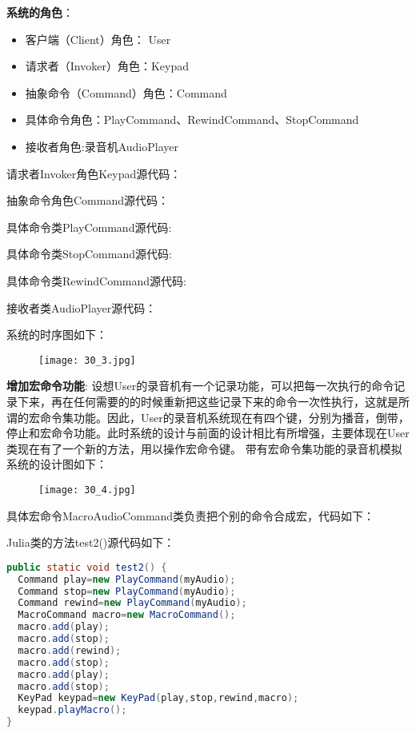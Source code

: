 \documentclass[../main.tex]{subfiles}
\begin{document}
\textbf{系统的角色}：
\begin{itemize}
  \item 客户端（Client）角色： User
  \item 请求者（Invoker）角色：Keypad
  \item 抽象命令（Command）角色：Command
  \item 具体命令角色：PlayCommand、RewindCommand、StopCommand
  \item 接收者角色:录音机AudioPlayer
\end{itemize}
%
请求者Invoker角色Keypad源代码：
%

%
抽象命令角色Command源代码：
%

%
具体命令类PlayCommand源代码:
%

%
具体命令类StopCommand源代码:
%

%
具体命令类RewindCommand源代码:
%

%
接收者类AudioPlayer源代码：
%


%
系统的时序图如下：
%
\begin{figure}[H]
  \texttt{[image: 30\_3.jpg]}
\end{figure}
%
\textbf{增加宏命令功能}:
设想User的录音机有一个记录功能，可以把每一次执行的命令记录下来，再在任何需要的的时候重新把这些记录下来的命令一次性执行，这就是所谓的宏命令集功能。因此，User的录音机系统现在有四个键，分别为播音，倒带，停止和宏命令功能。此时系统的设计与前面的设计相比有所增强，主要体现在User类现在有了一个新的方法，用以操作宏命令键。
带有宏命令集功能的录音机模拟系统的设计图如下：
%
\begin{figure}[H]
  \texttt{[image: 30\_4.jpg]}
\end{figure}
%

%
具体宏命令MacroAudioCommand类负责把个别的命令合成宏，代码如下：
%

%
Julia类的方法test2()源代码如下：
\begin{lstlisting}[language=java]
public static void test2() {
  Command play=new PlayCommand(myAudio);
  Command stop=new PlayCommand(myAudio);
  Command rewind=new PlayCommand(myAudio);
  MacroCommand macro=new MacroCommand();
  macro.add(play);
  macro.add(stop);
  macro.add(rewind);
  macro.add(stop);
  macro.add(play);
  macro.add(stop);
  KeyPad keypad=new KeyPad(play,stop,rewind,macro);
  keypad.playMacro();
}
\end{lstlisting}
%
\end{document}
